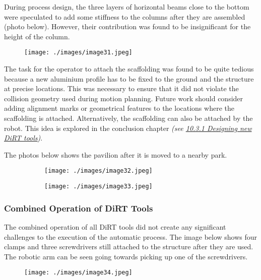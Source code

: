 During process design, the three layers of horizontal beams close to the bottom were speculated to add some stiffness to the columns after they are assembled (photo below). However, their contribution was found to be insignificant for the height of the column. 

\begin{figure}[H]
\texttt{[image: ./images/image31.jpeg]}
\end{figure}


The task for the operator to attach the scaffolding was found to be quite tedious because a new aluminium profile has to be fixed to the ground and the structure at precise locations. This was necessary to ensure that it did not violate the collision geometry used during motion planning. Future work should consider adding alignment  marks or geometrical features to the locations where the scaffolding is attached. Alternatively, the scaffolding can also be attached by the robot. This idea is explored in the conclusion chapter \textit{(see \uline{10.3.1 Designing new DiRT tools})}.

The photos below shows the pavilion after it is moved to a nearby park.

\begin{figure}[H]
\centering
\begin{subfigure}[b]{0.45\textwidth}
\centering
\texttt{[image: ./images/image32.jpeg]}
\end{subfigure}
\hfill
\begin{subfigure}[b]{0.45\textwidth}
\centering
\texttt{[image: ./images/image33.jpeg]}
\end{subfigure}
\end{figure}


\subsubsection{Combined Operation of DiRT Tools}

The combined operation of all DiRT tools did not create any significant challenges to the execution of the automatic process. The image below shows four clamps and three screwdrivers still attached to the structure after they are used. The robotic arm can be seen going towards picking up one of the screwdrivers.

\begin{figure}[H]
\texttt{[image: ./images/image34.jpeg]}
\end{figure}


